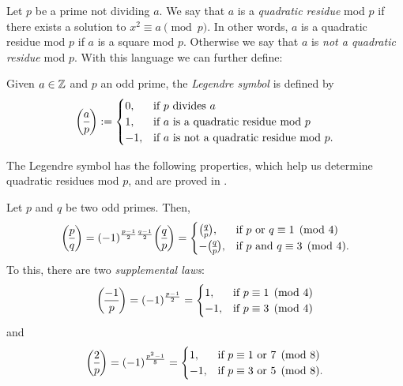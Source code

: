 \documentclass[../main.tex]{subfiles}
\begin{document}
Let $p$ be a prime not dividing $a$. We say that $a$ is a \emph{quadratic residue} mod $p$ if there exists a solution to $x^2\equiv a\pmod{p}$. In other words,  $a$ is a quadratic residue mod $p$ if $a$ is a square mod $p$. Otherwise we say that $a$ is \emph{not a quadratic residue} mod $p$. With this language we can further define:
\begin{definition}
	Given $a\in\mathbb{Z}$ and $p$ an odd prime, the \emph{Legendre symbol} is defined by
	\begin{equation*}
		\legendre{a}{p}:=
		\begin{cases}
			0, & \text{if $p$ divides $a$}\\	
			1, & \text{if $a$ is a quadratic residue mod $p$}\\	
			-1, & \text{if $a$ is not a quadratic residue mod $p$.}\\	
		\end{cases}
	\end{equation*}
\end{definition}
The Legendre symbol has the following properties, which help us determine quadratic residues mod $p$, and are proved in \cite[Chapter 4]{Marcus}.
\begin{theorem}\label{th:QR}
	Let $p$ and $q$ be two odd primes. Then, 
	\begin{equation}
		\legendre{p}{q}=(-1)^{\frac{p-1}{2}\frac{q-1}{2}}\legendre{q}{p}=
		\begin{cases}
			\legendre{q}{p}, & \text{if $p$ or $q \equiv 1\pmod{4}$}\\	
			-\legendre{q}{p}, & \text{if $p$ and $q \equiv 3\pmod{4}$.}\\	
		\end{cases}
	\end{equation}
	To this, there are two \emph{supplemental laws}:
	\begin{equation*}
		\legendre{-1}{p}=(-1)^{\frac{p-1}{2}}=
		\begin{cases}
			1, & \text{if $p \equiv 1\pmod{4}$}\\	
			-1, & \text{if $p \equiv 3\pmod{4}$}\\	
		\end{cases}
	\end{equation*}
	and
	\begin{equation*}
		\legendre{2}{p}=(-1)^{\frac{p^2-1}{8}}=
		\begin{cases}
			1, & \text{if $p \equiv 1$ or $ 7 \pmod{8}$}\\	
			-1, & \text{if $p \equiv 3$  or $5 \pmod{8}$.}\\	
		\end{cases}
	\end{equation*}	 
\end{theorem}
\end{document}

